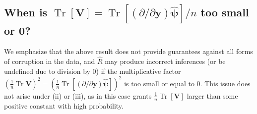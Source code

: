 \documentclass[11pt]{amsart}
\numberwithin{equation}{section}
\numberwithin{equation}{section}
\DeclareMathOperator{\trace}{Tr}
\def\mathbold{\boldsymbol} %
\def\bV{\mathbold{V}}\def\hbV{{\widehat{\bV}}}\def\tbV{{\widetilde{\bV}}}
\def\by{\mathbold{y}}\def\yhat{\widehat{y}}\def\ytil{\widetilde{y}}\def\ybar{{\overline y}}\def\vby{{\bf y}}
\def\bpsi{\mathbold{\psi}}\def\psihat{\widehat{\psi}}\def\hpsi{\widehat{\psi}}
\def\hbpsi{{\widehat{\bpsi}}}\def\tbpsi{{\widetilde{\bpsi}}}
\begin{document}
\subsection{When is \texorpdfstring{$\trace[\bV]= \trace[(\partial/\partial\by)\hbpsi]/n$}{trace dpsi/dy} too small or 0? }

\label{subsec:too_small}

We emphasize that the above result does not provide guarantees
against all forms of corruption in the data, and $\hat R$
may produce incorrect inferences (or be undefined due to division by 0)
if the multiplicative factor 
$(\frac 1 n \trace \bV)^2 
= 
(\frac 1 n \trace[(\partial/\partial\by)\hbpsi])^2$ is too small
or equal to 0.
This issue does not arise under (ii) or (iii), as in this case
 grants $\frac 1 n \trace[\bV]$ larger than
some positive constant with high probability.
\end{document}
